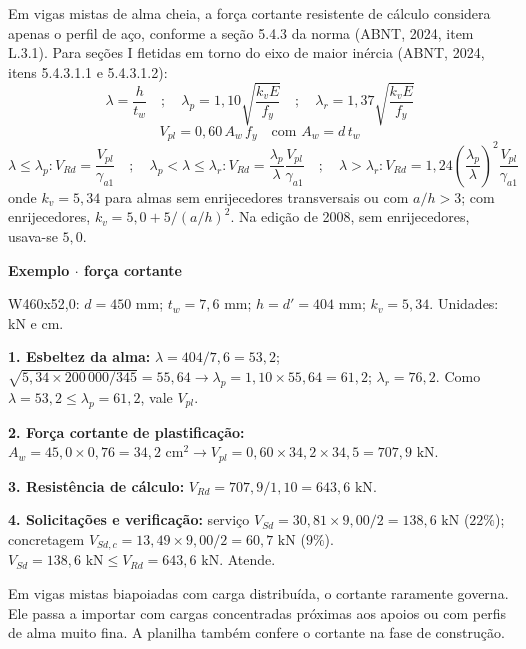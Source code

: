 \documentclass[11pt,a4paper]{article}
\newcommand{\caixaexemplo}[2]{%
  \par\vspace{6pt}\noindent\colorbox{examplebg}{%
    \parbox{\dimexpr\linewidth-2\fboxsep\relax}{%
      \vspace{4pt}\textbf{\color{exampleaccent}#1}\par\vspace{3pt}#2\vspace{4pt}%
    }%
  }\par\vspace{6pt}%
}
\begin{document}
Em vigas mistas de alma cheia, a força cortante resistente de cálculo considera apenas o perfil de aço, conforme a seção 5.4.3 da norma (ABNT, 2024, item L.3.1). Para seções I fletidas em torno do eixo de maior inércia (ABNT, 2024, itens 5.4.3.1.1 e 5.4.3.1.2):
\begin{equation}
  \lambda = \frac{h}{t_w} \quad ; \quad \lambda_p = 1{,}10\sqrt{\frac{k_v E}{f_y}} \quad ; \quad \lambda_r = 1{,}37\sqrt{\frac{k_v E}{f_y}}
  \label{eq:cortante-lambda}
\end{equation}
\begin{equation}
  V_{pl} = 0{,}60\, A_w\, f_y \quad \text{com } A_w = d\, t_w
  \label{eq:vpl}
\end{equation}
\begin{equation}
  \lambda \le \lambda_p: V_{Rd} = \frac{V_{pl}}{\gamma_{a1}} \quad ; \quad \lambda_p < \lambda \le \lambda_r: V_{Rd} = \frac{\lambda_p}{\lambda}\frac{V_{pl}}{\gamma_{a1}} \quad ; \quad \lambda > \lambda_r: V_{Rd} = 1{,}24\left(\frac{\lambda_p}{\lambda}\right)^2 \frac{V_{pl}}{\gamma_{a1}}
  \label{eq:vrd}
\end{equation}
onde $k_v = 5{,}34$ para almas sem enrijecedores transversais ou com $a/h > 3$; com enrijecedores, $k_v = 5{,}0 + 5/(a/h)^2$. Na edição de 2008, sem enrijecedores, usava-se $5{,}0$.

\caixaexemplo{Exemplo $\cdot$ força cortante}{%
W460x52,0: $d = 450\text{ mm}$; $t_w = 7{,}6\text{ mm}$; $h = d' = 404\text{ mm}$; $k_v = 5{,}34$. Unidades: kN e cm.\par
\textbf{1. Esbeltez da alma:} $\lambda = 404/7{,}6 = 53{,}2$; $\sqrt{5{,}34 \times 200\,000/345} = 55{,}64 \rightarrow \lambda_p = 1{,}10 \times 55{,}64 = 61{,}2$; $\lambda_r = 76{,}2$. Como $\lambda = 53{,}2 \le \lambda_p = 61{,}2$, vale $V_{pl}$.\par
\textbf{2. Força cortante de plastificação:} $A_w = 45{,}0 \times 0{,}76 = 34{,}2\text{ cm}^2 \rightarrow V_{pl} = 0{,}60 \times 34{,}2 \times 34{,}5 = 707{,}9\text{ kN}$.\par
\textbf{3. Resistência de cálculo:} $V_{Rd} = 707{,}9/1{,}10 = 643{,}6\text{ kN}$.\par
\textbf{4. Solicitações e verificação:} serviço $V_{Sd} = 30{,}81 \times 9{,}00/2 = 138{,}6\text{ kN}$ ($22\%$); concretagem $V_{Sd,c} = 13{,}49 \times 9{,}00/2 = 60{,}7\text{ kN}$ ($9\%$). $V_{Sd} = 138{,}6\text{ kN} \le V_{Rd} = 643{,}6\text{ kN}$. Atende.}

Em vigas mistas biapoiadas com carga distribuída, o cortante raramente governa. Ele passa a importar com cargas concentradas próximas aos apoios ou com perfis de alma muito fina. A planilha também confere o cortante na fase de construção.
\end{document}

